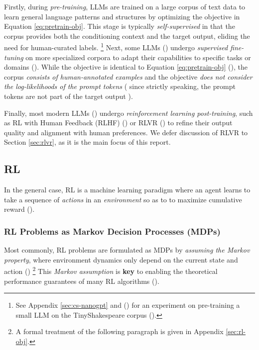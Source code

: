\documentclass{article} %
\theoremstyle{definition}
\begin{document}
Firstly, during \textit{pre-training}, LLMs are trained on a large corpus of text data
to learn general language patterns and structures by optimizing the objective in Equation \eqref{eq:pretrain-obj}.
This stage is typically \textit{self-supervised} in that the corpus
provides both the conditioning context and the target output, eliding
the need for human-curated labels. \footnote{
    See Appendix \ref{sec:cs-nanogpt} and (\cite{wk8})
    for an experiment on pre-training a small LLM on the TinyShakespeare corpus (\cite{tinyss, tinyss2}).
}
Next, some LLMs (\cite{InstructGPT-2022}) undergo \textit{supervised fine-tuning} on more specialized corpora to adapt 
their capabilities to specific tasks or domains (\cite{radford-et-al-2019,Brown-et-al-2020}).
While the objective is identical to Equation \eqref{eq:pretrain-obj} (\cite{wk5}),
the corpus \textit{consists of human-annotated examples} and 
the objective \textit{does not consider the log-likelihoods of the prompt tokens} (
    since strictly speaking, the prompt tokens are not part of the target output
).

Finally, most modern LLMs (\cite{tulu3, r1}) undergo \textit{reinforcement learning post-training},
such as RL with Human Feedback (RLHF) (\cite{Christiano-et-al-2017, InstructGPT-2022})
or RLVR (\cite{tulu3, grpo, r1}) to refine their output quality and alignment with human preferences.
We defer discussion of RLVR to Section \ref{sec:rlvr}, as it is the main focus of this report.

\subsection{RL}

In the general case, RL is a machine learning paradigm
where an agent learns to take a sequence of \textit{actions} 
in an \textit{environment} so as to to maximize cumulative reward (\cite{Sutton-and-Barto-1998}).

\subsubsection{RL Problems as Markov Decision Processes (MDPs)}
Most commonly, RL problems are formulated as MDPs
by \textit{assuming the Markov property}, where environment dynamics
only depend on the current state and action
(\cite{SpinningUp-2018, Levine-et-al-2023, Sutton-and-Barto-1998}) \footnote{
    A formal treatment of the following paragraph is given in Appendix \ref{sec:rl-obj}.
} This \textit{Markov assumption} is \textbf{key} to 
enabling the theoretical performance guarantees of many RL algorithms (\cite{Sutton-and-Barto-1998}).
\end{document}
